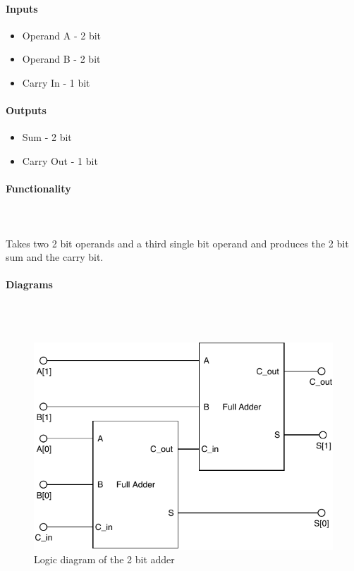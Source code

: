\documentclass{article}
\begin{document}
    \paragraph{Inputs}
    \begin{itemize}
        \item Operand A - 2 bit
        \item Operand B - 2 bit
        \item Carry In - 1 bit
    \end{itemize}

    \paragraph{Outputs}
    \begin{itemize}
        \item Sum - 2 bit
        \item Carry Out - 1 bit
    \end{itemize}

    \paragraph{Functionality}
    \hfill\\\\
    Takes two 2 bit operands and a third single bit operand and produces the
    2 bit sum and the carry bit.

    \paragraph{Diagrams}
    \hfill\\\\
    \begin{figure}[H]
        \centering
        \includegraphics{../diagrams/alu/adder/adder_2.pdf}
        \caption{Logic diagram of the 2 bit adder}
    \end{figure}
\end{document}
